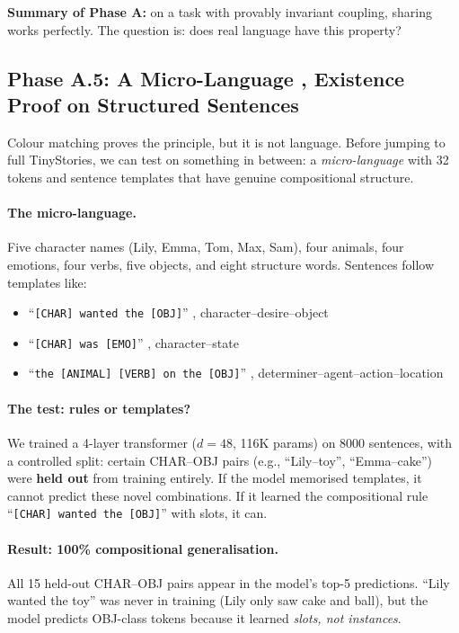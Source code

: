 \documentclass[11pt, a4paper]{article}
\theoremstyle{remark}
\begin{document}
\bigskip
\noindent\textbf{Summary of Phase A:} on a task with provably invariant coupling, sharing works perfectly.
The question is: does real language have this property?


\subsection{Phase A.5: A Micro-Language ,  Existence Proof on Structured Sentences}
\label{sec:grn:micro-language}

Colour matching proves the principle, but it is not language.
Before jumping to full TinyStories, we can test on something in between: a \emph{micro-language} with 32 tokens and sentence templates that have genuine compositional structure.

\paragraph{The micro-language.}
Five character names (Lily, Emma, Tom, Max, Sam), four animals, four emotions, four verbs, five objects, and eight structure words.
Sentences follow templates like:
\begin{itemize}[nosep]
    \item ``\texttt{[CHAR] wanted the [OBJ]}'' ,  character--desire--object
    \item ``\texttt{[CHAR] was [EMO]}'' ,  character--state
    \item ``\texttt{the [ANIMAL] [VERB] on the [OBJ]}'' ,  determiner--agent--action--location
\end{itemize}

\paragraph{The test: rules or templates?}
We trained a 4-layer transformer ($d{=}48$, 116K params) on 8000 sentences, with a controlled split: certain CHAR--OBJ pairs (e.g., ``Lily--toy'', ``Emma--cake'') were \textbf{held out} from training entirely.
If the model memorised templates, it cannot predict these novel combinations.
If it learned the compositional rule ``\texttt{[CHAR] wanted the [OBJ]}'' with slots, it can.

\paragraph{Result: 100\% compositional generalisation.}
All 15 held-out CHAR--OBJ pairs appear in the model's top-5 predictions.
``Lily wanted the toy'' was never in training (Lily only saw cake and ball), but the model predicts OBJ-class tokens because it learned \emph{slots, not instances}.
\end{document}
